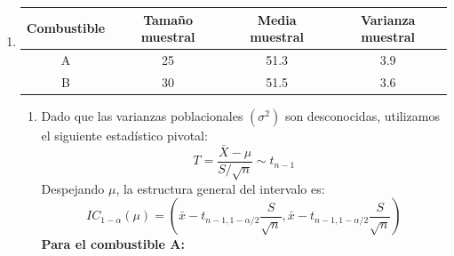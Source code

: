 \begin{enumerate}[label=\color{red}\textbf{\arabic*)}]
\begin{enumerate}[label=\arabic*)]
		            Sustituimos los valores de $a$ y $b$ en la expresión inicial: \[
			            \mathbb{P}\left[ 0\le X_{(1)}-\theta\le \dfrac{-\ln(\alpha)}{n} \right] =1-\alpha
		            \]
		            Restamos $X_{(1)}$ a todos los términos de la inecuación: \[
			            \mathbb{P}\left[ -X_{(1)}\le -\theta\le -X_{(1)}-\dfrac{\ln(\alpha)}{n} \right] =1-\alpha
		            \]
		            Multiplicamos por $-1$, lo que invierte el sentido de las desigualdades: \[
			            \mathbb{P}\left[ X_{(1)}+\dfrac{\ln(\alpha)}{n}\le \theta\le X_{(1)} \right] =1-\alpha
		            \]
		      \item Intervalo de confianza final \[
			            IC_{1-\alpha}(\theta)=\left[ X_{(1)}+\dfrac{\ln(\alpha)}{n},X_{(1)} \right]
		            \]
	      \end{enumerate}
	\item {}

	      {
		      \color{lightblue}
		      \begin{center}
			      \begin{tabular}{cccc}
				      \hline
				      Combustible & Tamaño muestral & Media muestral & Varianza muestral \\ \hline
				      A           & 25              & 51.3           & 3.9               \\
				      B           & 30              & 51.5           & 3.6               \\ \hline
			      \end{tabular}
		      \end{center}
	      }

	      \begin{enumerate}[label=\color{red}\textbf{\alph*)}]
		      \item {}

		            Dado que las varianzas poblacionales $(\sigma^2)$ son desconocidas, utilizamos el siguiente estadístico pivotal:
		            \[
			            T=\dfrac{\bar{X}-\mu}{S / \sqrt{n} }\sim t_{n-1}
		            \]
		            Despejando $\mu$, la estructura general del intervalo es: \[
			            IC_{1-\alpha}(\mu)=\left( \bar{x}-t_{n-1,1-\alpha/2} \dfrac{S}{\sqrt{n} },\bar{x}-t_{n-1,1-\alpha / 2} \dfrac{S}{\sqrt{n} } \right)
		            \]
		            \textbf{Para el combustible A:}


\end{enumerate}
\end{enumerate}
